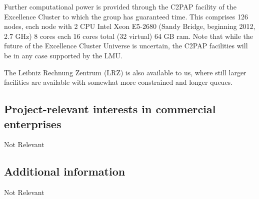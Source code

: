 \documentclass[10pt,fleqn,twoside]{article}
\newcommand{\Tcol}{\color{blue}}
\begin{document}
Further computational power is provided through the C2PAP facility of the Excellence Cluster to which
the group has guaranteed time. This comprises 126 nodes, each node with 2 CPU Intel Xeon E5-2680 (Sandy
Bridge, beginning 2012, 2.7 GHz) 8 cores each 16 cores total (32
virtual) 64 GB ram. Note that while the future of the Excellence
Cluster Universe is uncertain, the C2PAP facilities will be in any
case supported by the LMU. 

The Leibniz Rechnung Zentrum (LRZ) is also available to us, where still
larger facilities are available with somewhat more constrained and longer queues.

\subsection{\Tcol Project-relevant interests in commercial enterprises}

Not Relevant

\subsection{\Tcol Additional information}

Not Relevant
\end{document}
